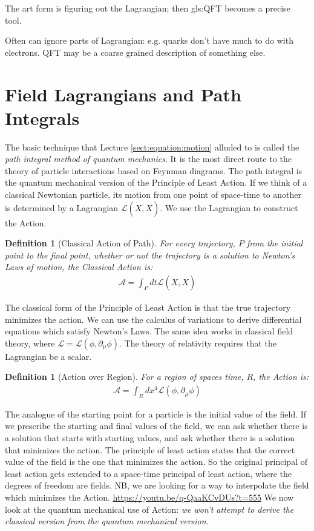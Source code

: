 \documentclass[]{article}
\newtheorem{defn}[thm]{Definition}
\begin{document}
The art form is figuring out the Lagrangian; then \gls{gls:QFT} becomes a precise tool.

Often can ignore parts of Lagrangian: e.g. quarks don't have much to do with electrons. QFT may be a coarse grained description of something else.
 

\section{Field Lagrangians and Path Integrals}

The basic technique that Lecture \ref{sect:equation:motion} alluded to is called the \emph{path integral method of quantum mechanics}. It is the most direct route to the theory of particle interactions based on Feynman diagrams. The path integral is the quantum mechanical version of the Principle of Least Action\cite{susskind2013quantum}. If we think of a classical Newtonian particle, its motion from one point of space-time to another is determined by a Lagrangian $\mathcal{L}(\dot{X},X)$. We use the Lagrangian to construct the Action. 

\begin{defn}[Classical Action of Path]
	For every trajectory, $P$ from the initial point to the final point, whether or not the trajectory is a solution to Newton's Laws of motion,  the Classical Action is: 
	\begin{align*}
		\mathcal{A}=\int_P dt \mathcal{L}(\dot{X},X)
	\end{align*}
\end{defn}


The classical form of the Principle of Least Action is that the true trajectory minimizes the action. We can use the calculus of variations to derive differential equations which satisfy Newton's Laws. The same idea works in classical field theory, where $\mathcal{L}=\mathcal{L}(\phi,\partial_\mu\phi)$. The theory of relativity requires that the Lagrangian be a scalar\cite{susskind2017special}.

\begin{defn}[Action over Region]
	For a region of spaces time, $R$,  the Action is: 
	\begin{align*}
		\mathcal{A}=\int_R dx^4 \mathcal{L}(\phi,\partial_\mu\phi)
	\end{align*}
\end{defn}

The analogue of the starting point for a particle is the initial value of the field. If we prescribe the starting and final values of the field, we can ask whether there is a solution that starts with starting values, and ask whether there is a solution that minimizes the action. The principle of least action states that the correct value of the field is the one that minimizes the action. So the original principal of least action gets extended to a space-time principal of least action, where the degrees of freedom are fields. NB, we are looking for a way to interpolate the field which minimizes the Action.
\url{https://youtu.be/q-QaaKCvDUs?t=555}
We now look at the quantum mechanical use of Action: \emph{we won't attempt to derive the classical version from the quantum mechanical version.}
\end{document}
